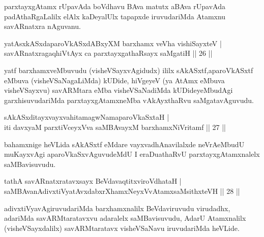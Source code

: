 \begin{artha}
parxtayxgAtamx rUpavAda boVdhavu BAva matutx aBAva rUpavAda padAthaRgaLalilx elAlx kaDeyalUlx tapapxde iruvudariMda Atamxnu savARnatxra nAguvanu.
\end{artha}


\begin{shl}
yatAsxkASxdaparoVkASxdABxyXM barxhamx veVha vishiSayxteV |\\
savARnatxragaqhiVtAyx ca parxtayxgathaRsayx saMgatiH \hfill || 26 ||
\end{shl}

\begin{artha}
yatf barxhamxveMbuvudu (visheVSayxvAgidudx) ililx sAkASxtf,\break aparoVkASxtf eMbuva (visheVSaNagaLiMda) kUDide, hiVgeyeV (ya AtAmx eMbuva visheVSayxvu) savARMtara eMba visheVSaNadiMda kUDideyeMbudAgi garxhisuvudariMda parxtayxgAtamxneMba vAkAyxthaRvu saMgatavAguvudu. 
\end{artha}


\begin{shl}
sAkASxditayxvayxvahitamagwNamaparoVkaSxtaH |\\
iti davxyaM parxtiVceyxVva saMBAvayxM barxhamxNiVritamf \hfill || 27 ||
\end{shl}

\begin{artha}
bahamxnige heVLida sAkASxtf eMdare vayxvadhAnavilalxde neVrA\break eMbudU muKayxvAgi aparoVkaSxvAguvudeMdU I eraDu\break athaRvU parxtayxgAtamxnalelx saMBavisuvudu.
\end{artha}%

\begin{shl}
tathA savARnatxratavxsayx BeVdavaqtitxviroVdhataH |\\
saMBAvanA\s divxtiVyatAvxdabxrXhamxNeyxVvA\s \s tamxsaMsithxteVH \hfill || 28 ||
\end{shl}

\begin{artha}
adivxtiVyavAgiruvudariMda barxhamxnalilx BeVdaviruvudu virudadhx, adariMda savARMtaratavxvu adaralelx saMBavisuvudu, AdarU Atamxnalilx (visheVSayxdalilx) savARMtaratavx visheVSaNavu iruvudariMda heVLide.
\end{artha}


